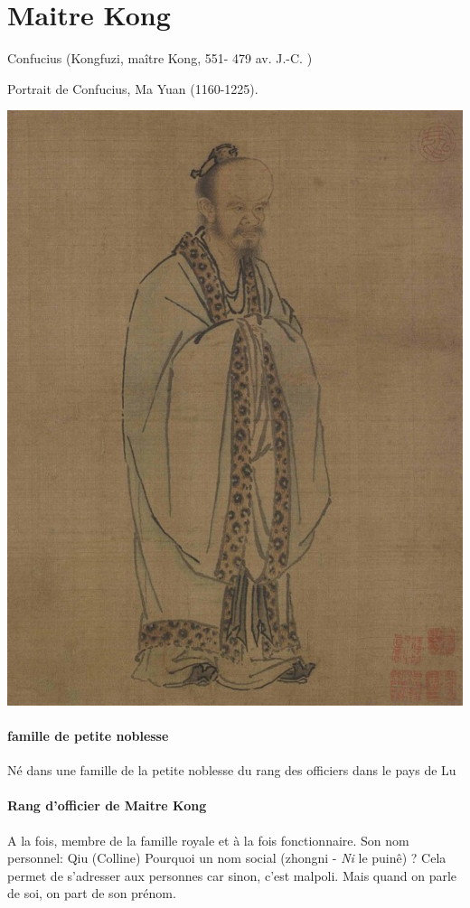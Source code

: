 \section{Maitre Kong}
Confucius (Kongfuzi, maître Kong, 551- 479 av. J.-C. )
\begin{marginfigure}
    \centering
    \caption{Portrait de Confucius, Ma Yuan (1160-1225).}
    \includegraphics[width=\textwidth]{ConfucianismeTaoismeBouddhismeChinois/Images/Confucius.jpg}

    \label{fig:enter-label}
\end{marginfigure}

\paragraph{famille de petite noblesse}Né dans une famille de la petite noblesse du rang des officiers dans le pays de Lu
\paragraph{Rang d'officier de Maitre Kong} A la fois, membre de la famille royale et à la fois fonctionnaire. Son nom personnel: Qiu (Colline)
Pourquoi un nom social (zhongni - \textit{Ni} le puinê) ? Cela permet de s'adresser aux personnes car sinon, c'est malpoli.
Mais quand on parle de soi, on part de son prénom.


